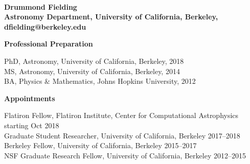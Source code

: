 \documentclass[11pt,letterpaper,english]{article}
\begin{document}
\setlength{\parindent}{0in} %

\pagestyle{fancy}   \renewcommand{%
\headrulewidth}{0.0pt}



\\
{\bf Drummond Fielding}\\
{\bf Astronomy Department, University of California, Berkeley, dfielding@berkeley.edu} \smallskip

\begin{flushleft} {\bf Professional Preparation}
{\parindent 16pt

PhD, Astronomy, University of California, Berkeley, 2018 \\ 
MS, Astronomy, University of California, Berkeley, 2014 \\ 
BA, Physics \& Mathematics, Johns Hopkins University, 2012 \\ 
}

\vspace{.04in}
{\bf Appointments}
{\parindent 16pt

Flatiron Fellow, Flatiron Institute, Center for Computational Astrophysics \hfill starting Oct 2018\\ 
Graduate Student Researcher, University of California, Berkeley \hfill  2017--2018  \\
Berkeley Fellow, University of California, Berkeley     \hfill  2015--2017 \\ 
NSF Graduate Research Fellow, University of California, Berkeley  \hfill  2012--2015 \\
}


\end{flushleft}
\end{document}

